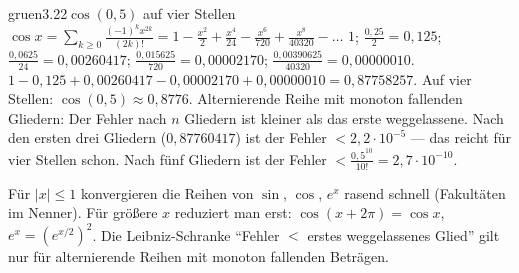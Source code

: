 \begin{loesungkarte}{gruen}{3.22}{$\cos(0{,}5)$ auf vier Stellen}
$\cos x = \sum_{k\ge0}\frac{(-1)^{k}x^{2k}}{(2k)!} = 1 - \frac{x^{2}}2 + \frac{x^{4}}{24} - \frac{x^{6}}{720} + \frac{x^{8}}{40320} - \dots$
$1$; $\frac{0{,}25}2 = 0{,}125$; $\frac{0{,}0625}{24} = 0{,}00260417$; $\frac{0{,}015625}{720} = 0{,}00002170$; $\frac{0{,}00390625}{40320} = 0{,}00000010$.
$1 - 0{,}125 + 0{,}00260417 - 0{,}00002170 + 0{,}00000010 = 0{,}87758257$. Auf vier Stellen: $\cos(0{,}5)\approx0{,}8776$.
Alternierende Reihe mit monoton fallenden Gliedern: Der Fehler nach $n$ Gliedern ist kleiner als das erste weggelassene. Nach den ersten drei Gliedern ($0{,}87760417$) ist der Fehler $< 2{,}2\cdot10^{-5}$ --- das reicht für vier Stellen schon. Nach fünf Gliedern ist der Fehler $< \frac{0{,}5^{10}}{10!} = 2{,}7\cdot10^{-10}$.
\begin{mitnehmen}\kastentext
Für $|x|\le1$ konvergieren die Reihen von $\sin$, $\cos$, $e^{x}$ rasend schnell (Fakultäten im Nenner). Für größere $x$ reduziert man erst: $\cos(x + 2\pi) = \cos x$, $e^{x} = (e^{x/2})^{2}$. Die Leibniz-Schranke \enquote{Fehler $<$ erstes weggelassenes Glied} gilt nur für alternierende Reihen mit monoton fallenden Beträgen.
\end{mitnehmen}
\end{loesungkarte}

